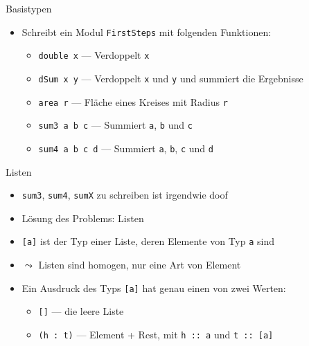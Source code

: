 \documentclass{beamer}
\begin{document}
\begin{frame}{Basistypen}

        \begin{itemize}
                \item Schreibt ein Modul \texttt{FirstSteps} mit folgenden Funktionen:
                \begin{itemize}
                        \item \texttt{double x} --- Verdoppelt \texttt{x}
                        \item \texttt{dSum x y} --- Verdoppelt \texttt{x} und \texttt{y} und summiert die Ergebnisse
                        \item \texttt{area r} --- Fläche eines Kreises mit Radius \texttt{r}
                        \item \texttt{sum3 a b c} --- Summiert \texttt{a}, \texttt{b} und \texttt{c}
                        \item \texttt{sum4 a b c d} --- Summiert \texttt{a}, \texttt{b}, \texttt{c} und \texttt{d}
                \end{itemize}
        \end{itemize}
\end{frame}

\begin{frame}{Listen}
        \begin{itemize}
                \item \texttt{sum3}, \texttt{sum4}, \texttt{sumX} zu schreiben ist irgendwie doof
                \pause
                \item Lösung des Problems: Listen
                \item \texttt{[a]} ist der Typ einer Liste, deren Elemente von Typ \texttt{a} sind
                \item $\leadsto$ Listen sind homogen, nur eine Art von Element
        \end{itemize}


        \begin{itemize}
                \item Ein Ausdruck des Typs \texttt{[a]} hat genau einen von zwei Werten:
                \begin{itemize}
                        \item \texttt{[]} --- die leere Liste
                        \item \texttt{(h : t)} --- Element + Rest, mit \texttt{h :: a} und \texttt{t :: [a]}
                \end{itemize}
        \end{itemize}
\end{frame}
\end{document}
